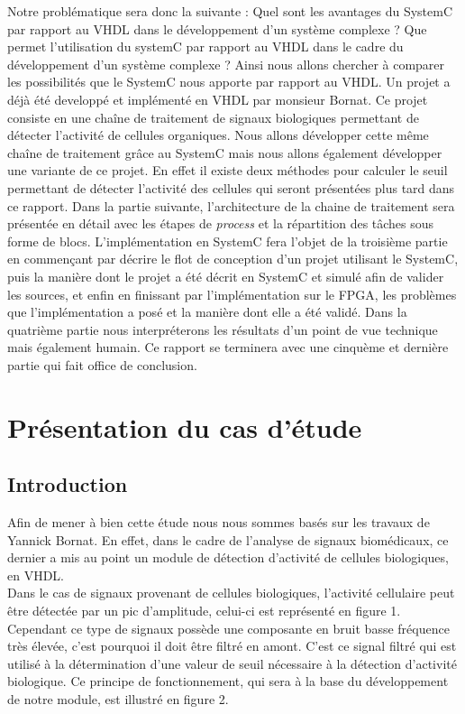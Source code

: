 \documentclass[a4paper,12pt]{article}
\begin{document}
Notre problématique sera donc la suivante : Quel sont les avantages du SystemC par rapport au VHDL dans le développement d'un système complexe ?  
Que permet l’utilisation du systemC par rapport au VHDL dans le cadre du développement d’un système complexe ? \newline
Ainsi nous allons chercher à comparer les possibilités que le SystemC nous apporte par rapport au VHDL. Un projet a déjà été developpé et implémenté en VHDL par monsieur Bornat. Ce projet consiste en une chaîne de traitement de signaux biologiques permettant de détecter l'activité de cellules organiques. Nous allons développer cette même chaîne de traitement grâce au SystemC mais nous allons également développer une variante de ce projet. En effet il existe deux méthodes pour calculer le seuil permettant de détecter l'activité des cellules qui seront présentées plus tard dans ce rapport.\newline
Dans la partie suivante, l'architecture de la chaine de traitement sera présentée en détail avec les étapes de \textit{process} et la répartition des tâches sous forme de blocs. L'implémentation en SystemC fera l'objet de la troisième partie en commençant par décrire le flot de conception d'un projet utilisant le SystemC, puis la manière dont le projet a été décrit en SystemC et simulé afin de valider les sources, et enfin en finissant par l'implémentation sur le FPGA, les problèmes que l'implémentation a posé et la manière dont elle a été validé. Dans la quatrième partie nous interpréterons les résultats d'un point de vue technique mais également humain. Ce rapport se terminera avec une cinquème et dernière partie qui fait office de conclusion.

\newpage
\section{Présentation du cas d'étude}
\subsection{Introduction}
Afin de mener à bien cette étude nous nous sommes basés sur les travaux de Yannick Bornat. En effet, dans le cadre de l'analyse de signaux biomédicaux, ce dernier a mis au point un module de détection d'activité de cellules biologiques, en VHDL.\\

Dans le cas de signaux provenant de cellules biologiques, l'activité cellulaire peut être détectée par un pic d'amplitude, celui-ci est représenté en figure 1. Cependant ce type de signaux possède une composante en bruit basse fréquence très élevée, c'est pourquoi il doit être filtré en amont. C'est ce signal filtré qui est utilisé à la détermination d'une valeur de seuil nécessaire à la détection d'activité biologique. Ce principe de fonctionnement, qui sera à la base du développement de notre module, est illustré en figure 2.\\
\end{document}
